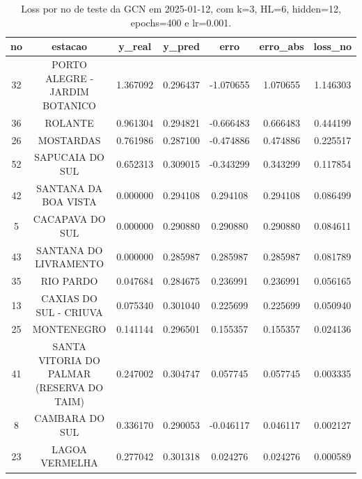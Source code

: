 \begin{table}[h]
\centering
\caption{Loss por no de teste da GCN em 2025-01-12, com k=3, HL=6, hidden=12, epochs=400 e lr=0.001.}
\label{tab:gcn_loss_k3_hl6_h12_e400_d20250112}
\begin{tabular}{ccccccc}
\toprule
no & estacao & y\_real & y\_pred & erro & erro\_abs & loss\_no \\
\midrule
32 & PORTO ALEGRE - JARDIM BOTANICO & 1.367092 & 0.296437 & -1.070655 & 1.070655 & 1.146303 \\
36 & ROLANTE & 0.961304 & 0.294821 & -0.666483 & 0.666483 & 0.444199 \\
26 & MOSTARDAS & 0.761986 & 0.287100 & -0.474886 & 0.474886 & 0.225517 \\
52 & SAPUCAIA DO SUL & 0.652313 & 0.309015 & -0.343299 & 0.343299 & 0.117854 \\
42 & SANTANA DA BOA VISTA & 0.000000 & 0.294108 & 0.294108 & 0.294108 & 0.086499 \\
5 & CACAPAVA DO SUL & 0.000000 & 0.290880 & 0.290880 & 0.290880 & 0.084611 \\
43 & SANTANA DO LIVRAMENTO & 0.000000 & 0.285987 & 0.285987 & 0.285987 & 0.081789 \\
35 & RIO PARDO & 0.047684 & 0.284675 & 0.236991 & 0.236991 & 0.056165 \\
13 & CAXIAS DO SUL - CRIUVA & 0.075340 & 0.301040 & 0.225699 & 0.225699 & 0.050940 \\
25 & MONTENEGRO & 0.141144 & 0.296501 & 0.155357 & 0.155357 & 0.024136 \\
41 & SANTA VITORIA DO PALMAR (RESERVA DO TAIM) & 0.247002 & 0.304747 & 0.057745 & 0.057745 & 0.003335 \\
8 & CAMBARA DO SUL & 0.336170 & 0.290053 & -0.046117 & 0.046117 & 0.002127 \\
23 & LAGOA VERMELHA & 0.277042 & 0.301318 & 0.024276 & 0.024276 & 0.000589 \\
\bottomrule
\end{tabular}
\end{table}
